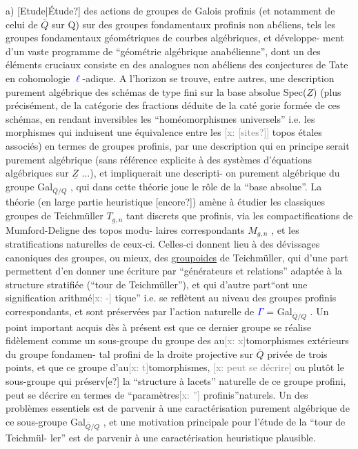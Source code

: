 \documentclass[11pt]{article}
\newcommand{\hand}[1]{\textcolor{blue}{#1}}
\newcommand{\xout}[1]{\textcolor{gray}{[\textsf{x:} #1]}}
\newcommand{\uline}[1]{\underline{#1}}
\newcommand{\unsure}[1]{[#1?]}
\begin{document}
a)  \unsure{Etude|Étude} des actions de groupes de Galois profinis (et notamment de
celui de $\overline{Q}$ sur Q) sur des groupes fondamentaux profinis non abéliens,  tels
les groupes fondamentaux géométriques de courbes algébriques,  et développe-%
ment d'un vaste programme de ``géométrie algébrique anabélienne'', dont un des
éléments cruciaux consiste en des analogues non abéliens des conjectures
de Tate en cohomologie \hand{$\ell$}-adique. A l'horizon se trouve,  entre autres, une
description purement algébrique des schémas de type fini sur la base absolue
Spec($\underline{Z}$) (plus précisément,  de la catégorie des fractions déduite de la caté
gorie formée de ces schémas,  en rendant inversibles les ``homéomorphismes
universels'' i.e. les morphismes qui induisent une équivalence entre les \xout{\unsure{sites}}
topos étales associés) en termes de groupes profinis,  par une description
qui en principe serait purement algébrique (sans référence explicite à des
systèmes d'équations algébriques sur $\underline{Z}$ ...),  et impliquerait une descripti-%
on purement algébrique du groupe Gal$_{\overline{Q}/Q}$ ,  qui dans cette théorie joue le
rôle de la ``base absolue''.  La théorie (en large partie heuristique \unsure{encore})
amène à étudier les classiques groupes de Teichmüller $T_{g,n}$  tant discrets
que profinis,  via les compactifications de Mumford-Deligne des topos modu-%
laires correspondants $M_{g,n}$ ,  et les stratifications naturelles de ceux-ci.
Celles-ci donnent lieu à des dévissages canoniques des groupes, ou mieux,
des \uline{groupoides} de Teichmüller,  qui d'une part permettent d'en donner une
écriture par ``générateurs et relations'' adaptée à la structure stratifiée
(``tour de Teichmüller''),  et qui d'autre part``ont une signification arithmé\xout{-}%
tique'' i.e. se reflètent au niveau des groupes profinis correspondants,  et
sont préservées par l'action naturelle de \hand{$\Gamma$} = Gal$_{\overline{Q}/Q}$ .  Un point important
acquis dès à présent est que ce dernier groupe se réalise fidèlement comme
un sous-groupe du groupe des au\xout{x}tomorphismes extérieurs du groupe fondamen-%
tal profini de la droite projective sur $\overline{Q}$ privée de trois points, et que ce
groupe d'au\xout{t}tomorphismes, \xout{peut se décrire} ou plutôt le sous-groupe qui préserv\unsure{e}
la ``structure à lacets'' naturelle de ce groupe profini,  peut se décrire en
termes de ``paramètres\xout{''} profinis''naturels.  Un des problèmes essentiels est
de parvenir à une caractérisation purement algébrique de ce sous-groupe
Gal$_{\overline{Q}/Q}$ ,  et une motivation principale pour l'étude de la ``tour de Teichmül-%
ler'' est de parvenir à une caractérisation heuristique plausible.
\end{document}
